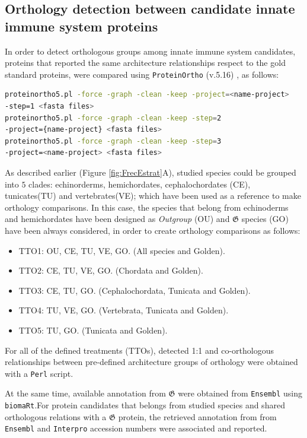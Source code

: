 \documentclass[11pt]{article}
\begin{document}
\subsection*{Orthology detection between candidate innate immune system 
proteins}
In order to detect orthologous groups among innate immune system candidates, 
proteins that reported the same architecture relationships respect to the gold 
standard proteins, were compared using \texttt{ProteinOrtho} (v.5.16) \cite{Lechner2011}, 
as follows:

\begin{lstlisting}[language=bash, breaklines=true]
proteinortho5.pl -force -graph -clean -keep -project=<name-project> 
-step=1 <fasta files>
proteinortho5.pl -force -graph -clean -keep -step=2 
-project={name-project} <fasta files>
proteinortho5.pl -force -graph -clean -keep -step=3  
-project=<name-project> <fasta files>
\end{lstlisting}

As described earlier (Figure \ref{fig:FrecEstrat}A), studied species could be grouped
into $5$ clades: echinorderms, hemichordates, cephalochordates (CE), tunicates(TU) and vertebrates(VE); which have been used as a reference to make orthology comparisons. In this case, the species that belong
from echinoderms and hemichordates have been designed as \textsl{Outgroup} (OU) and 
$\boldsymbol{\mathfrak{G}}$  species (GO) have been always considered, in order to create orthology
comparisons as follows:
\begin{itemize}
 \item TTO1: OU, CE, TU, VE, GO. (All species and Golden).
 \item TTO2: CE, TU, VE, GO. (Chordata and Golden).
 \item TTO3: CE, TU, GO. (Cephalochordata, Tunicata and Golden).
 \item TTO4: TU, VE, GO. (Vertebrata, Tunicata and Golden).
 \item TTO5: TU, GO. (Tunicata and Golden).
\end{itemize}

For all of the defined treatments (TTOs), detected 1:1 and co-orthologous relationships between 
pre-defined architecture groups of orthology were obtained with a \texttt{Perl} script.

At the same time, available annotation from $\boldsymbol{\mathfrak{G}}$ were obtained from 
\texttt{Ensembl} using \texttt{biomaRt}.For protein candidates that belongs from studied 
species and shared orthologous relations with a $\boldsymbol{\mathfrak{G}}$ protein, the 
retrieved annotation from from \texttt{Ensembl} and \texttt{Interpro} accession numbers were 
associated and reported.
\end{document}
